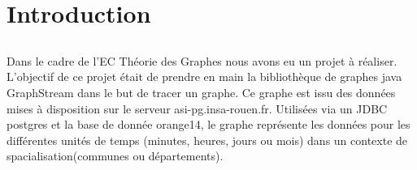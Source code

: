 \chapter{Introduction}

\section*{}
Dans le cadre de l'EC Théorie des Graphes nous avons eu un projet à réaliser.
L'objectif de ce projet était de prendre en main la bibliothèque de graphes java GraphStream dans le but de tracer un graphe. Ce graphe est issu des données mises à disposition sur le serveur asi-pg.insa-rouen.fr. Utilisées via un JDBC postgres et la base de donnée orange14, le graphe représente les données pour les différentes unités de temps (minutes, heures, jours ou mois) dans un contexte de spacialisation(communes ou départements).
\section*{}
